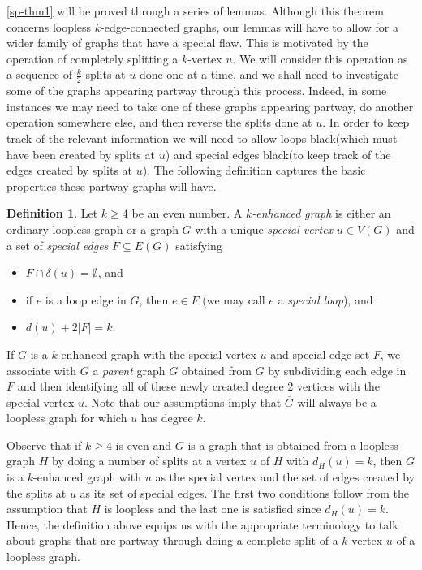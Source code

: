 \documentclass[letterpaper,11pt]{article}
\theoremstyle{definition}
\newtheorem*{definition}{Definition}
\newcommand{\col}{black}
\begin{document}
\cref{sp-thm1} will be proved through a series of lemmas.   Although this theorem concerns loopless $k$-edge-connected graphs, our lemmas will have to allow for a wider family of graphs that have a special flaw.  This is motivated by the operation of completely splitting a $k$-vertex $u$.  We will consider this operation as a sequence of $\frac{k}{2}$  splits at $u$ done one at a time, and we shall need to investigate some of the graphs appearing partway  through this process.  Indeed, in  some instances we may need to take one of these  graphs appearing partway, do another operation somewhere else, and then reverse the splits  done at $u$.  In order to keep track of the relevant information we will need to allow loops {\color \col{(which must have been created by splits at $u$)}} and special edges {\color \col{(to keep track of the edges created by splits at $u$)}}.  The following definition captures the basic properties these partway graphs will have.  

	
\begin{definition}
Let $k\ge 4$ be an even number. A \emph{$k$-enhanced graph} is either an ordinary loopless graph or a graph $G$ with a unique \emph{special vertex} $u\in V(G)$ and a set of \emph{special edges}  $F\subseteq E(G)$ satisfying

\begin{itemize}
	\item $F \cap \delta(u) = \emptyset$, and
	\item if $e$ is a loop edge in $G$, then $e \in F$ (we may call $e$ a \emph{special loop}), and
	\item $d(u) + 2|F| = k$.
\end{itemize}	
\end{definition}


If $G$ is a $k$-enhanced graph with the special vertex $u$ and special edge set $F$, we associate with $G$ a  \emph{parent} graph $\overline{G}$ obtained from $G$ by subdividing each edge in $F$  and then identifying all of these newly created degree 2 vertices with the special vertex $u$.  Note that our assumptions imply that $\overline{G}$ will always be a loopless graph for which $u$ has degree $k$.  


\bigskip

Observe that if $k\ge 4$ is even and $G$ is a graph that is obtained from a loopless graph $H$ by doing a number of splits at a vertex $u$ of $H$ with $d_H(u) = k$, then $G$ is a $k$-enhanced graph with $u$ as the special vertex and the set of edges created by the splits at $u$ as its set of special edges. The first two conditions follow from the assumption that $H$ is loopless and the last one is satisfied since $d_H(u) = k$. Hence, the definition above equips us with the appropriate terminology to talk about graphs that are partway through doing a complete split of a $k$-vertex $u$ of a loopless graph.
	
\end{document}
